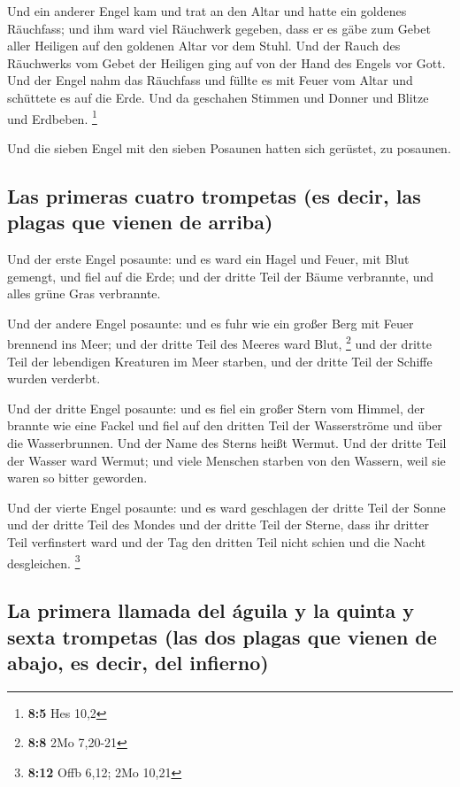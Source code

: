  Und ein anderer Engel kam und trat an den Altar und hatte
ein goldenes Räuchfass; und ihm ward viel Räuchwerk gegeben, dass er es
gäbe zum Gebet aller Heiligen auf den goldenen Altar vor dem Stuhl.
 Und der Rauch des Räuchwerks vom Gebet der Heiligen ging
auf von der Hand des Engels vor Gott.  Und der Engel nahm
das Räuchfass und füllte es mit Feuer vom Altar und schüttete es auf die
Erde. Und da geschahen Stimmen und Donner und Blitze und Erdbeben.
\footnote{\textbf{8:5} Hes 10,2}

 Und die sieben Engel mit den sieben Posaunen hatten sich
gerüstet, zu posaunen.

\hypertarget{las-primeras-cuatro-trompetas-es-decir-las-plagas-que-vienen-de-arriba}{%
\subsection{Las primeras cuatro trompetas (es decir, las plagas que
vienen de
arriba)}\label{las-primeras-cuatro-trompetas-es-decir-las-plagas-que-vienen-de-arriba}}

 Und der erste Engel posaunte: und es ward ein Hagel und
Feuer, mit Blut gemengt, und fiel auf die Erde; und der dritte Teil der
Bäume verbrannte, und alles grüne Gras verbrannte.

 Und der andere Engel posaunte: und es fuhr wie ein großer
Berg mit Feuer brennend ins Meer; und der dritte Teil des Meeres ward
Blut, \footnote{\textbf{8:8} 2Mo 7,20-21}  und der dritte
Teil der lebendigen Kreaturen im Meer starben, und der dritte Teil der
Schiffe wurden verderbt.

 Und der dritte Engel posaunte: und es fiel ein großer
Stern vom Himmel, der brannte wie eine Fackel und fiel auf den dritten
Teil der Wasserströme und über die Wasserbrunnen.  Und
der Name des Sterns heißt Wermut. Und der dritte Teil der Wasser ward
Wermut; und viele Menschen starben von den Wassern, weil sie waren so
bitter geworden.

 Und der vierte Engel posaunte: und es ward geschlagen
der dritte Teil der Sonne und der dritte Teil des Mondes und der dritte
Teil der Sterne, dass ihr dritter Teil verfinstert ward und der Tag den
dritten Teil nicht schien und die Nacht desgleichen. \footnote{\textbf{8:12}
  Offb 6,12; 2Mo 10,21}

\hypertarget{la-primera-llamada-del-uxe1guila-y-la-quinta-y-sexta-trompetas-las-dos-plagas-que-vienen-de-abajo-es-decir-del-infierno}{%
\subsection{La primera llamada del águila y la quinta y sexta trompetas
(las dos plagas que vienen de abajo, es decir, del
infierno)}\label{la-primera-llamada-del-uxe1guila-y-la-quinta-y-sexta-trompetas-las-dos-plagas-que-vienen-de-abajo-es-decir-del-infierno}}

